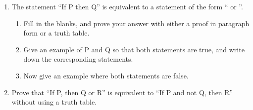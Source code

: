 \begin{enumerate}
    \item The statement ``If P then Q'' is equivalent to a statement of the form ``\underline{\hspace{.5in}} or \underline{\hspace{.5in}}''.
  \begin{enumerate}
      \item Fill in the blanks, and prove your answer with either a proof in paragraph form or a truth table.
      \item Give an example of P and Q so that both statements are true, and write down the corresponding statements.
      \item Now give an example where both statements are false.
  \end{enumerate}

    \item Prove that ``If P, then Q or R'' is equivalent to ``If P and not Q, then R'' without using a truth table.
\end{enumerate}
